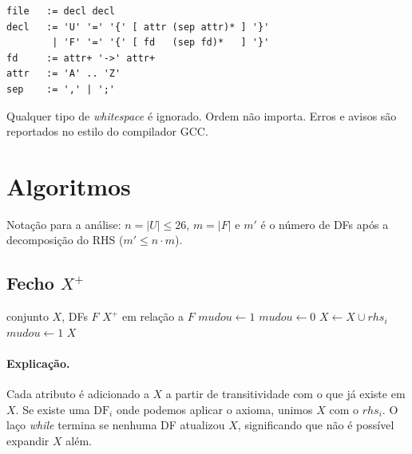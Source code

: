 \documentclass[11pt,a4paper]{article}
\newcommand{\cl}[1]{\ensuremath{#1^{+}}}
\newcommand{\cmd}[1]{\texttt{#1}}
\begin{document}
\begin{verbatim}
file   := decl decl
decl   := 'U' '=' '{' [ attr (sep attr)* ] '}'
        | 'F' '=' '{' [ fd   (sep fd)*   ] '}'
fd     := attr+ '->' attr+
attr   := 'A' .. 'Z'
sep    := ',' | ';'
\end{verbatim}

Qualquer tipo de \textit{whitespace} é ignorado. Ordem não importa.
Erros e avisos são reportados no estilo do compilador GCC.






\section{Algoritmos}

Notação para a análise: $n = |U| \le 26$, $m = |F|$ e $m'$ é o número de DFs
após a decomposição do RHS ($m' \le n \cdot m$).



\subsection{Fecho \texorpdfstring{$X^{+}$}{X+}}

\begin{algorithm}[H]
    \caption{Fecho de atributos (\cmd{closure} / \cmd{closure\_skip})}
    \begin{algorithmic}[1]
        \Require conjunto $X$, DFs $F$
        \Ensure \cl{X} em relação a $F$
        \State $mudou \gets 1$
        \State $mudou \gets 0$
        \State $X \gets X \cup \mathit{rhs}_i$
        \State $mudou \gets 1$
        \EndIf
        \EndFor
        \EndWhile
        \State \Return $X$
    \end{algorithmic}
\end{algorithm}

\paragraph{Explicação.} Cada atributo é adicionado a $X$ a partir de transitividade
com o que já existe em $X$. Se existe uma $\text{DF}_i$ onde podemos aplicar o
axioma, unimos $X$ com o $\mathit{rhs}_i$. O laço \textit{while} termina se nenhuma
DF atualizou $X$, significando que não é possível expandir $X$ além.
\end{document}
